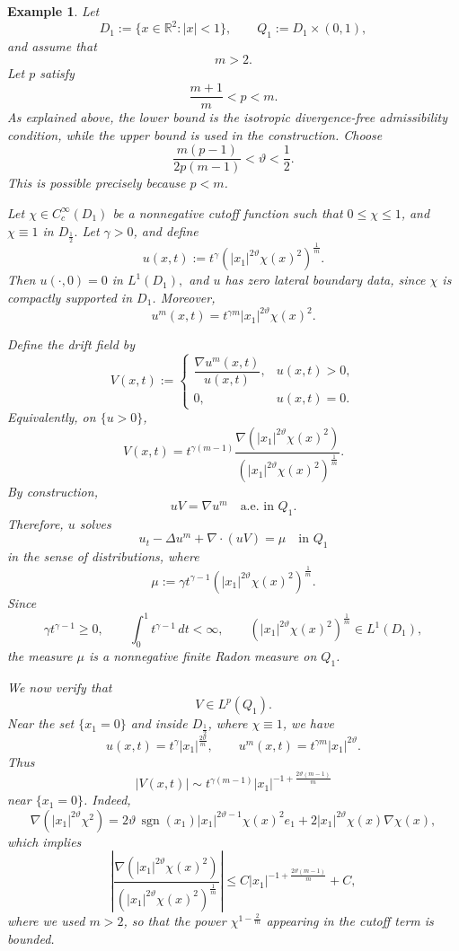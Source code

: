 \documentclass{amsart}
\newtheorem{example}[defn]{Example}
\numberwithin{equation}{section}
\begin{document}
\begin{example}
\label{ex:m-greater-than-two-Lp-drift}
Let
\[
D_1:=\{x\in\mathbb R^2:|x|<1\},
\qquad
Q_1:=D_1\times(0,1),
\]
and assume that
\[
m>2.
\]
Let \(p\) satisfy
\[
\frac{m+1}{m}<p<m.
\]
As explained above, the lower bound is the isotropic divergence-free admissibility condition, while the upper bound is used in the construction.
Choose
\[
\frac{m(p-1)}{2p(m-1)}
<
\vartheta
<
\frac{1}{2}.
\]
This is possible precisely because \(p<m\).

Let \(\chi\in C_c^\infty(D_1)\) be a nonnegative cutoff function such that
\(
0\le \chi\le1
\), and 
\(
\chi\equiv1
\) in \(
D_{\frac{1}{2}}.
\)
Let \(\gamma>0\), and define
\[
u(x,t)
:=
t^\gamma
\left(
|x_1|^{2\vartheta}\chi(x)^2
\right)^{\frac{1}{m}}.
\]
Then
\(
u(\cdot,0)=0
\) in \(
L^1(D_1),
\)
and \(u\) has zero lateral boundary data, since \(\chi\) is compactly supported
in \(D_1\). Moreover,
\[
u^m(x,t)
=
t^{\gamma m}|x_1|^{2\vartheta}\chi(x)^2.
\]

Define the drift field by
\[
V(x,t):=
\begin{cases}
\dfrac{\nabla u^m(x,t)}{u(x,t)}, & u(x,t)>0,\\[2mm]
0, & u(x,t)=0.
\end{cases}
\]
Equivalently, on \(\{u>0\}\),
\[
V(x,t)
=
t^{\gamma(m-1)}
\frac{
\nabla\left(|x_1|^{2\vartheta}\chi(x)^2\right)
}{
\left(|x_1|^{2\vartheta}\chi(x)^2\right)^{\frac{1}{m}}
}.
\]
By construction,
\[
uV=\nabla u^m
\quad\text{a.e. in }Q_1.
\]
Therefore, %
\(u\) solves
\[
u_t-\Delta u^m+\nabla\cdot(uV)=\mu
\quad\text{in } Q_1
\]
in the sense of distributions,
where
\[
\mu
:=
\gamma t^{\gamma-1}
\left(
|x_1|^{2\vartheta}\chi(x)^2
\right)^{\frac{1}{m}}.
\]
Since
\[
\gamma t^{\gamma-1}\ge0,
\qquad
\int_0^1 t^{\gamma-1}\,dt<\infty,
\qquad
\left(
|x_1|^{2\vartheta}\chi(x)^2
\right)^{\frac{1}{m}}
\in L^1(D_1),
\]
the measure \(\mu\) is a nonnegative finite Radon measure on \(Q_1\).

We now verify that
\[
V\in L^p(Q_1).
\]
Near the set \(\{x_1=0\}\) and inside \(D_{\frac{1}{2}}\), where
\(\chi\equiv1\), we have
\[
u(x,t)=t^\gamma |x_1|^{\frac{2\vartheta}{m}},
\qquad
u^m(x,t)=t^{\gamma m}|x_1|^{2\vartheta}.
\]
Thus
\[
|V(x,t)|
\sim
t^{\gamma(m-1)}
|x_1|^{-1+\frac{2\vartheta(m-1)}{m}}
\]
near \(\{x_1=0\}\).
Indeed,
\[
\nabla\left(|x_1|^{2\vartheta}\chi^2\right)
=
2\vartheta\,\operatorname{sgn}(x_1)
|x_1|^{2\vartheta-1}\chi(x)^2 e_1
+
2|x_1|^{2\vartheta}\chi(x)\nabla\chi(x),
\]
which implies
\[
\left|
\frac{
\nabla\left(|x_1|^{2\vartheta}\chi(x)^2\right)
}{
\left(|x_1|^{2\vartheta}\chi(x)^2\right)^{\frac{1}{m}}
}
\right|
\le
C|x_1|^{-1+\frac{2\vartheta(m-1)}{m}}
+
C,
\]
where we used \(m>2\), so that the power 
\(
\chi^{1-\frac{2}{m}}
\)
appearing in the cutoff term is bounded.


\end{example}
\end{document}
